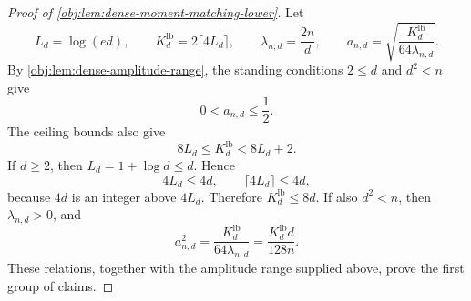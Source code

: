 \begin{proof}[Proof of \cref{obj:lem:dense-moment-matching-lower}]
Let
\[
L_d=\log(ed),\qquad
K_d^{\mathrm{lb}}=2\lceil 4L_d\rceil,\qquad
\lambda_{n,d}=\frac{2n}{d},\qquad
a_{n,d}=\sqrt{\frac{K_d^{\mathrm{lb}}}{64\lambda_{n,d}}}.
\]
By \cref{obj:lem:dense-amplitude-range}, the standing conditions \(2\le d\) and \(d^2<n\) give
\[
0<a_{n,d}\le \frac12.
\]
The ceiling bounds also give
\[
8L_d\le K_d^{\mathrm{lb}}<8L_d+2.
\]
If \(d\ge2\), then \(L_d=1+\log d\le d\). Hence
\[
4L_d\le 4d,\qquad \lceil 4L_d\rceil\le 4d,
\]
because \(4d\) is an integer above \(4L_d\). Therefore \(K_d^{\mathrm{lb}}\le8d\). If also \(d^2<n\), then \(\lambda_{n,d}>0\), and
\[
a_{n,d}^2
=
\frac{K_d^{\mathrm{lb}}}{64\lambda_{n,d}}
=
\frac{K_d^{\mathrm{lb}}d}{128n}.
\]
These relations, together with the amplitude range supplied above, prove the first group of claims.


\end{proof}
